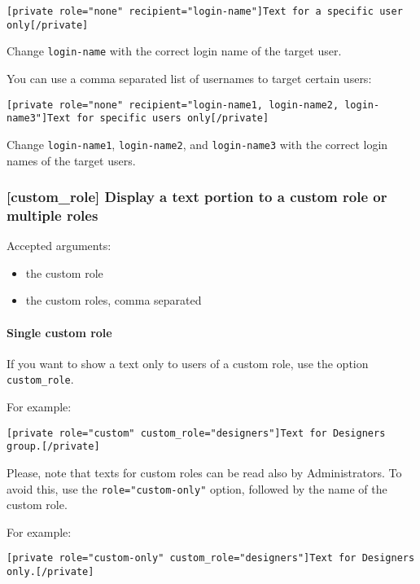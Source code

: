 \documentclass[
	titlepage,
	headinclude,
	abstract=on,
	paper=a4,
	fontsize=11pt,
]{scrartcl}
\begin{document}
\begin{lstlisting}
[private role="none" recipient="login-name"]Text for a specific user only[/private]
\end{lstlisting}

Change \verb+login-name+ with the correct login name of the target user.

You can use a comma separated list of usernames to target certain users:

\begin{lstlisting}
[private role="none" recipient="login-name1, login-name2, login-name3"]Text for specific users only[/private]
\end{lstlisting}

Change \verb+login-name1+, \verb+login-name2+, and \verb+login-name3+ with the correct login names of the target users.

\subsubsection{[custom\_role] Display a text portion to a custom role or multiple roles}

Accepted arguments:

\begin{itemize}
 \item the custom role
 \item the custom roles, comma separated
\end{itemize}

\paragraph{Single custom role}

If you want to show a text only to users of a custom role, use the option \verb+custom_role+.

For example:

\begin{lstlisting}
[private role="custom" custom_role="designers"]Text for Designers group.[/private]
\end{lstlisting}


Please, note that texts for custom roles can be read also by Administrators. To avoid this, use the \verb+role="custom-only"+ option, followed by the name of the custom role.

For example:

\begin{lstlisting}
[private role="custom-only" custom_role="designers"]Text for Designers only.[/private]
\end{lstlisting}
\end{document}
